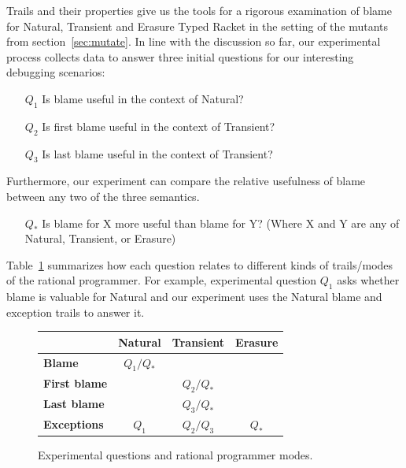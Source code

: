 
Trails and their properties give us the tools for a rigorous examination
of blame for Natural, Transient and Erasure Typed Racket in the setting of the 
mutants from section~\ref{sec:mutate}. In line with the discussion so far, 
our experimental process collects data to answer three initial questions
for our interesting debugging scenarios:
\begin{itemize}
\item[$Q_1$] Is blame useful in the context of Natural?

\item[$Q_2$] Is first blame useful in the context of Transient?

\item[$Q_3$] Is last blame useful in the context of Transient?

\end{itemize}

Furthermore, our experiment can compare the relative usefulness of blame
between any two of the three semantics. 
\begin{itemize}
\item[$Q_*$] Is blame for X more useful than blame for Y? (Where X and Y are any of Natural, Transient, or Erasure)
\end{itemize}


Table~\ref{fig:experiment-outline} summarizes how each question relates to
different kinds of trails/modes of the rational programmer. For example, experimental
question $Q_1$ asks whether blame is valuable for Natural and our experiment
uses the Natural blame and exception trails to answer it.

\begin{figure}[ht]
\center
{\begin{tabular}{l|c|c|c}
                        & {\bf Natural}  & {\bf Transient} &  {\bf Erasure} \\ \hline 
{\bf Blame}             &  $Q_1/Q_*$    &                  &                \\
{\bf First blame}       &               &     $Q_2/Q_*$    &                 \\
{\bf Last blame}        &               &     $Q_3/Q_*$    &                 \\
{\bf Exceptions}        &      $Q_1$    &     $Q_2/Q_3$    &      $Q_*$      \\
\end{tabular}}
  \caption{ Experimental questions and rational programmer modes.}
  \label{fig:experiment-outline}
\end{figure}


